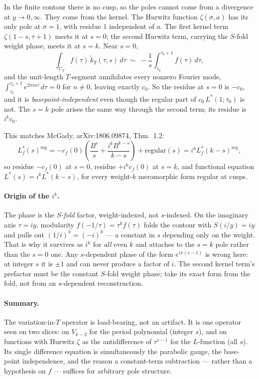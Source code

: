 \documentclass[11pt]{article}
\newcommand{\tk}{\widetilde{k}_T}
\begin{document}
In the finite contour there is no cusp, so the poles cannot come from a divergence at
$y\to0,\infty$. They come from the kernel. The Hurwitz function $\zeta(\sigma,a)$ has
its only pole at $\sigma=1$, with residue $1$ independent of $a$. The first kernel
term $\zeta(1-s,\tau+1)$ meets it at $s=0$; the second Hurwitz term, carrying the
$S$-fold weight phase, meets it at $s=k$. Near $s=0$,
\[
  \int_{C_T} f(\tau)\,\tk(\tau,s)\,d\tau
  \;\sim\; -\frac1s\int_{\tau_0}^{\tau_0+1} f(\tau)\,d\tau ,
\]
and the unit-length $T$-segment annihilates every nonzero Fourier mode,
$\int_{\tau_0}^{\tau_0+1} e^{2\pi i n\tau}\,d\tau=0$ for $n\neq0$, leaving exactly
$c_0$. So the residue at $s=0$ is $-c_0$, and it is \emph{basepoint-independent} even
though the regular part of $c_0\,L^*(1;\tau_0)$ is not. The $s=k$ pole arises the same
way through the second term; its residue is $i^k c_0$.

This matches McGady, arXiv:1806.09874, Thm.~1.2:
\[
  L_f^*(s)^{\mathrm{reg}}
  =-c_f(0)\!\left(\frac{B^s}{s}+\frac{i^k B^{k-s}}{k-s}\right)+\mathrm{regular}(s)
  = i^k L_f^*(k-s)^{\mathrm{reg}},
\]
so residue $-c_f(0)$ at $s=0$, residue $+i^k c_f(0)$ at $s=k$, and functional equation
$L^*(s)=i^k L^*(k-s)$, for every weight-$k$ meromorphic form regular at cusps.

\paragraph{Origin of the $i^k$.} The phase is the \emph{$S$-fold} factor, weight-indexed,
not $s$-indexed. On the imaginary axis $\tau=iy$, modularity $f(-1/\tau)=\tau^k f(\tau)$
folds the contour with $S(i/y)=iy$ and pulls out $(1/i)^k=(-i)^k$ --- a constant in $s$
depending only on the weight. That is why it survives as $i^k$ for \emph{all} even $k$
and attaches to the $s=k$ pole rather than the $s=0$ one. Any $s$-dependent phase of
the form $e^{i\pi(s-1)}$ is wrong here: at integer $s$ it is $\pm1$ and can never
produce a factor of $i$. The second kernel term's prefactor must be the constant
$S$-fold weight phase; take its exact form from the fold, not from an $s$-dependent
reconstruction.

\paragraph{Summary.}
The variation-in-$T$ operator is load-bearing, not an artifact. It is one operator
seen on two slices: on $V_{k-2}$ for the period polynomial (integer $s$), and on
functions with Hurwitz $\zeta$ as the antidifference of $\tau^{s-1}$ for the
$L$-function (all $s$). Its single difference equation is simultaneously the
parabolic gauge, the base-point independence, and the reason a constant-term
subtraction --- rather than a hypothesis on $f$ --- suffices for arbitrary pole
structure.
\end{document}

